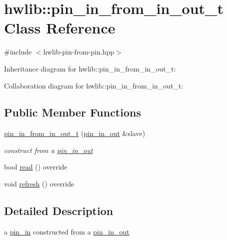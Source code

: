 \hypertarget{classhwlib_1_1pin__in__from__in__out__t}{}\section{hwlib\+:\+:pin\+\_\+in\+\_\+from\+\_\+in\+\_\+out\+\_\+t Class Reference}
\label{classhwlib_1_1pin__in__from__in__out__t}


{\ttfamily \#include $<$hwlib-\/pin-\/from-\/pin.\+hpp$>$}



Inheritance diagram for hwlib\+:\+:pin\+\_\+in\+\_\+from\+\_\+in\+\_\+out\+\_\+t\+:


Collaboration diagram for hwlib\+:\+:pin\+\_\+in\+\_\+from\+\_\+in\+\_\+out\+\_\+t\+:
\subsection*{Public Member Functions}
\begin{DoxyCompactItemize}
\item 
\mbox{\label{classhwlib_1_1pin__in__from__in__out__t_af7627f870a1df9fdf84fd4e94adc09f4}} 
\hyperlink{classhwlib_1_1pin__in__from__in__out__t_af7627f870a1df9fdf84fd4e94adc09f4}{pin\+\_\+in\+\_\+from\+\_\+in\+\_\+out\+\_\+t} (\hyperlink{classhwlib_1_1pin__in__out}{pin\+\_\+in\+\_\+out} \&slave)
\begin{DoxyCompactList}\small\item\em construct from a \hyperlink{classhwlib_1_1pin__in__out}{pin\+\_\+in\+\_\+out} \end{DoxyCompactList}\item 
bool \hyperlink{classhwlib_1_1pin__in__from__in__out__t_ae2f49f0010b6a6177fad9099e3d7cbd2}{read} () override
\item 
void \hyperlink{classhwlib_1_1pin__in__from__in__out__t_a51580b6d77cfe54dee904c9f567cbc33}{refresh} () override
\end{DoxyCompactItemize}


\subsection{Detailed Description}
a \hyperlink{classhwlib_1_1pin__in}{pin\+\_\+in} constructed from a \hyperlink{classhwlib_1_1pin__in__out}{pin\+\_\+in\+\_\+out}

